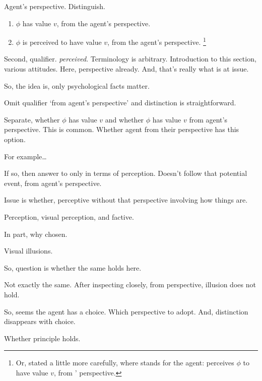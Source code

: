 \begin{note}
  Agent's perspective.
  Distinguish.

  \begin{enumerate}
  \item
    \(\phi\) has value \(v\), from the agent's perspective.
  \item
    \(\phi\) is perceived to have value \(v\), from the agent's perspective.%
    \footnote{
      Or, stated a little more carefully, where \vAgent{} stands for the agent:
      \vAgent{} perceives \(\phi\) to have value \(v\), from \vAgent{}' perspective.
    }
  \end{enumerate}

  Second, qualifier.
  \emph{perceived}.
  Terminology is arbitrary.
  Introduction to this section, various attitudes.
  Here, perspective already.
  And, that's really what is at issue.

  {
    \color{red}
    So, the idea is, only psychological facts matter.
  }

  Omit qualifier `from agent's perspective' and distinction is straightforward.

  Separate, whether \(\phi\) has value \(v\) and whether \(\phi\) has value \(v\) from agent's perspective.
  This is common.
  Whether agent from their perspective has this option.

  For example\dots

  If so, then answer to \qzS{} only in terms of perception.
  Doesn't follow that potential event, from agent's perspective.

  Issue is whether, perceptive without that perspective involving how things are.

  Perception, visual perception, and factive.

  In part, why chosen.

  Visual illusions.

  So, question is whether the same holds here.

  Not exactly the same.
  After inspecting closely, from perspective, illusion does not hold.

  So, seems the agent has a choice.
  Which perspective to adopt.
  And, distinction disappears with choice.

  Whether principle holds.
\end{note}

